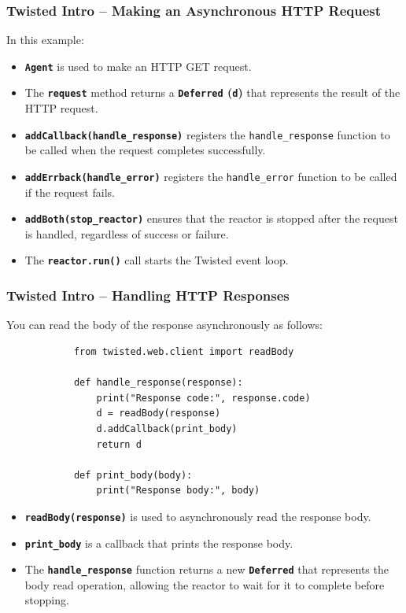 \documentclass{beamer}
\begin{document}
    \begin{frame}[containsverbatim]
        \frametitle{Twisted Intro -- Making an Asynchronous HTTP Request}

        \noindent In this example:
        \begin{itemize}
            \item \textbf{\texttt{Agent}} is used to make an HTTP GET request.
            \item The \textbf{\texttt{request}} method returns a \textbf{\texttt{Deferred} (\texttt{d})} that represents the result of the HTTP request.
            \item \textbf{\texttt{addCallback(handle\_response)}} registers the \texttt{handle\_response} function to be called when the request completes successfully.
            \item \textbf{\texttt{addErrback(handle\_error)}} registers the \texttt{handle\_error} function to be called if the request fails.
            \item \textbf{\texttt{addBoth(stop\_reactor)}} ensures that the reactor is stopped after the request is handled, regardless of success or failure.
            \item The \textbf{\texttt{reactor.run()}} call starts the Twisted event loop.
        \end{itemize}
    \end{frame}

    \begin{frame}[containsverbatim]
        \frametitle{Twisted Intro -- Handling HTTP Responses}

        You can read the body of the response asynchronously as follows:

        \begin{lstlisting}
            from twisted.web.client import readBody

            def handle_response(response):
                print("Response code:", response.code)
                d = readBody(response)
                d.addCallback(print_body)
                return d

            def print_body(body):
                print("Response body:", body)
            \end{lstlisting}
            \begin{itemize}
                \item \textbf{\texttt{readBody(response)}} is used to asynchronously read the response body.
                \item \textbf{\texttt{print\_body}} is a callback that prints the response body.
                \item The \textbf{\texttt{handle\_response}} function returns a new \textbf{\texttt{Deferred}} that represents the body read operation, allowing the reactor to wait for it to complete before stopping.
            \end{itemize}
    \end{frame}
\end{document}
